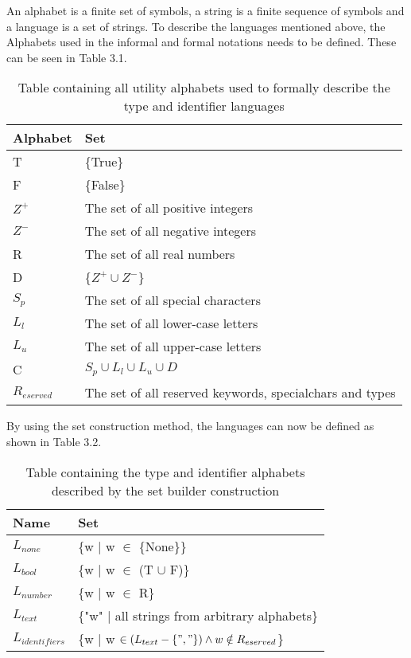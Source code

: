 An alphabet is a finite set of symbols, a string is a finite sequence of symbols and a language is a set of strings.
To describe the languages mentioned above, the Alphabets used in the informal and formal notations needs to be defined. 
These can be seen in Table 3.1.

\begin{table}[!htb]
	\centering
	\begin{tabular}{|l|l|}
		\hline
		\textbf{Alphabet} & \textbf{Set}                            \\ \hline
		T                 & \{True\}                                \\ \hline
		F                 & \{False\}                               \\ \hline
		$Z^+$             & The set of all positive integers        \\ \hline
		$Z^-$             & The set of all negative integers        \\ \hline
		R                 & The set of all real numbers             \\ \hline
		D                 & \{$Z^+ \cup Z^-$\}                      \\ \hline
		$S_p$             & The set of all special characters      \\ \hline
		$L_l$             & The set of all lower-case letters       \\ \hline
		$L_u$             & The set of all upper-case letters       \\ \hline
		C                 & $S_p \cup L_l \cup L_u \cup D$          \\ \hline
		$R_{eserved}$     & The set of all reserved keywords, specialchars and types \\ \hline
	\end{tabular}
	\caption{Table containing all utility alphabets used to formally describe the type and identifier languages}
\end{table}

By using the set construction method, the languages can now be defined as shown in Table 3.2.

\begin{table}[!htb]
	\centering
	\label{my-label}
	\begin{tabular}{|l|l|}
		\hline
		\textbf{Name}     & \textbf{Set}                                    \\ \hline
		$L_{none}$        & \{w | w $\in$ \{None\}\}                        \\ \hline
		$L_{bool}$        & \{w | w $\in$ (T $\cup$ F)\}                    \\ \hline
		$L_{number}$      & \{w | w $\in$ R\}                               \\ \hline
		$L_{text}$        & \{"w" | all strings from arbitrary alphabets\}  \\ \hline
		$L_{identifiers}$ & \{w | w $\in (L_{text} - \{", "\}) \wedge w \notin R_{eserved}$\} \\ \hline
	\end{tabular}
	\caption{Table containing the type and identifier alphabets described by the set builder construction}
\end{table}

